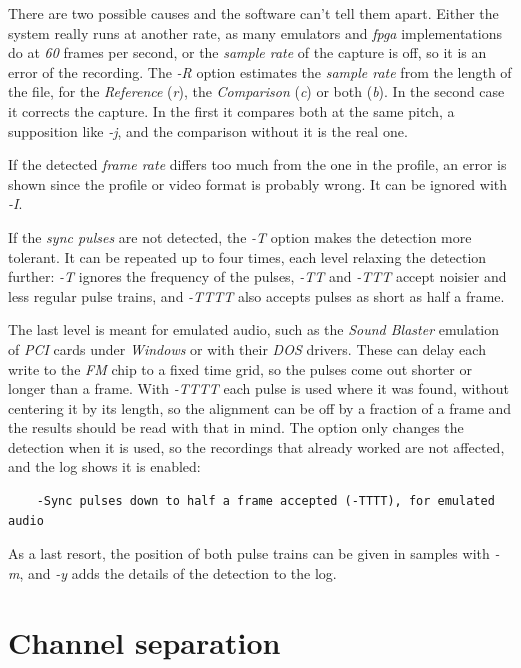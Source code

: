 \documentclass[10pt,a4paper]{report}
\newcommand{\ac}[1]{\textit{\mbox{\acrshort{#1}}}}
\begin{document}
\begin{appendices}
There are two possible causes and the software can't tell them apart. Either the system really runs at another rate, as many emulators and \ac{fpga} implementations do at \textit{60} frames per second, or the \textit{sample rate} of the capture is off, so it is an error of the recording. The \textit{-R} option estimates the \textit{sample rate} from the length of the file, for the \textit{Reference} (\textit{r}), the \textit{Comparison} (\textit{c}) or both (\textit{b}). In the second case it corrects the capture. In the first it compares both at the same pitch, a supposition like \textit{-j}, and the comparison without it is the real one.

If the detected \textit{frame rate} differs too much from the one in the profile, an error is shown since the profile or video format is probably wrong. It can be ignored with \textit{-I}.

If the \textit{sync pulses} are not detected, the \textit{-T} option makes the detection more tolerant. It can be repeated up to four times, each level relaxing the detection further: \textit{-T} ignores the frequency of the pulses, \textit{-TT} and \textit{-TTT} accept noisier and less regular pulse trains, and \textit{-TTTT} also accepts pulses as short as half a frame.

The last level is meant for emulated audio, such as the \textit{Sound Blaster} emulation of \textit{PCI} cards under \textit{Windows} or with their \textit{DOS} drivers. These can delay each write to the \textit{FM} chip to a fixed time grid, so the pulses come out shorter or longer than a frame. With \textit{-TTTT} each pulse is used where it was found, without centering it by its length, so the alignment can be off by a fraction of a frame and the results should be read with that in mind. The option only changes the detection when it is used, so the recordings that already worked are not affected, and the log shows it is enabled:
\begin{verbatim}
	-Sync pulses down to half a frame accepted (-TTTT), for emulated audio
\end{verbatim}

As a last resort, the position of both pulse trains can be given in samples with \textit{-m}, and \textit{-y} adds the details of the detection to the log.

\chapter{Channel separation}
\label{separation}


\end{appendices}
\end{document}
